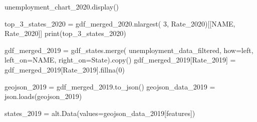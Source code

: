 \documentclass[
  letterpaper,
  DIV=11,
  numbers=noendperiod]{scrartcl}
\newenvironment{Shaded}{\begin{snugshade}}{\end{snugshade}}
\newcommand{\BuiltInTok}[1]{\textcolor[rgb]{0.00,0.23,0.31}{#1}}
\newcommand{\DecValTok}[1]{\textcolor[rgb]{0.68,0.00,0.00}{#1}}
\newcommand{\NormalTok}[1]{\textcolor[rgb]{0.00,0.23,0.31}{#1}}
\newcommand{\OperatorTok}[1]{\textcolor[rgb]{0.37,0.37,0.37}{#1}}
\newcommand{\StringTok}[1]{\textcolor[rgb]{0.13,0.47,0.30}{#1}}
\begin{document}
\begin{Shaded}
\begin{Highlighting}[]
\NormalTok{unemployment\_chart\_2020.display()}

\NormalTok{top\_3\_states\_2020 }\OperatorTok{=}\NormalTok{ gdf\_merged\_2020.nlargest(}
    \DecValTok{3}\NormalTok{, }\StringTok{\textquotesingle{}Rate\_2020\textquotesingle{}}\NormalTok{)[[}\StringTok{\textquotesingle{}NAME\textquotesingle{}}\NormalTok{, }\StringTok{\textquotesingle{}Rate\_2020\textquotesingle{}}\NormalTok{]]}
\BuiltInTok{print}\NormalTok{(top\_3\_states\_2020)}

\NormalTok{gdf\_merged\_2019 }\OperatorTok{=}\NormalTok{ gdf\_states.merge(}
\NormalTok{    unemployment\_data\_filtered, how}\OperatorTok{=}\StringTok{\textquotesingle{}left\textquotesingle{}}\NormalTok{, left\_on}\OperatorTok{=}\StringTok{\textquotesingle{}NAME\textquotesingle{}}\NormalTok{, right\_on}\OperatorTok{=}\StringTok{\textquotesingle{}State\textquotesingle{}}\NormalTok{).copy()}
\NormalTok{gdf\_merged\_2019[}\StringTok{\textquotesingle{}Rate\_2019\textquotesingle{}}\NormalTok{] }\OperatorTok{=}\NormalTok{ gdf\_merged\_2019[}\StringTok{\textquotesingle{}Rate\_2019\textquotesingle{}}\NormalTok{].fillna(}\DecValTok{0}\NormalTok{)}

\NormalTok{geojson\_2019 }\OperatorTok{=}\NormalTok{ gdf\_merged\_2019.to\_json()}
\NormalTok{geojson\_data\_2019 }\OperatorTok{=}\NormalTok{ json.loads(geojson\_2019)}

\NormalTok{states\_2019 }\OperatorTok{=}\NormalTok{ alt.Data(values}\OperatorTok{=}\NormalTok{geojson\_data\_2019[}\StringTok{\textquotesingle{}features\textquotesingle{}}\NormalTok{])}


\end{Highlighting}
\end{Shaded}
\end{document}
